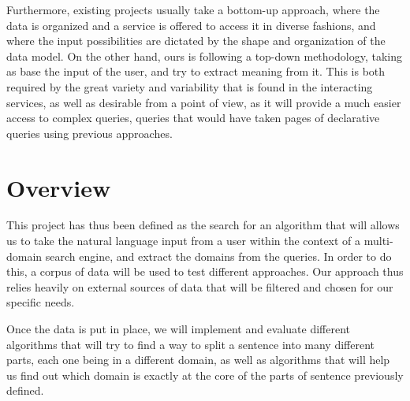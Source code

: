 Furthermore, existing projects usually take a bottom-up approach, where the data is organized and a service is offered to access it in diverse fashions, and where the input possibilities are dictated by the shape and organization of the data model. On the other hand, ours is following a top-down methodology, taking as base the input of the user, and try to extract meaning from it. This is both required by the great variety and variability that is found in the interacting services, as well as desirable from a point of view, as it will provide a much easier access to complex queries, queries that would have taken pages of declarative queries using previous approaches.


\section{Overview} %
\label{sec:overview}

This project has thus been defined as the search for an algorithm that will allows us to take the natural language input from a user within the context of a multi-domain search engine, and extract the domains from the queries. In order to do this, a corpus of data will be used to test different approaches. Our approach thus relies heavily on external sources of data that will be filtered and chosen for our specific needs.

Once the data is put in place, we will implement and evaluate different algorithms that will try to find a way to split a sentence into many different parts, each one being in a different domain, as well as algorithms that will help us find out which domain is exactly at the core of the parts of sentence previously defined.



